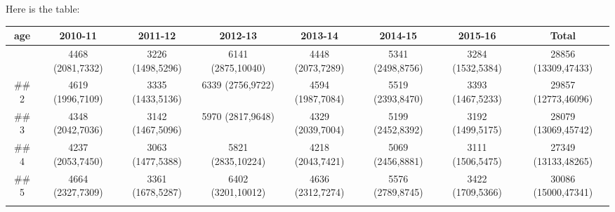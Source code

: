 \documentclass{article}\usepackage[]{graphicx}\usepackage[]{color}
\makeatletter
\newenvironment{kframe}{%
 \def\at@end@of@kframe{}%
 \ifinner\ifhmode%
  \def\at@end@of@kframe{\end{minipage}}%
  \begin{minipage}{\columnwidth}%
 \fi\fi%
 \def\FrameCommand##1{\hskip\@totalleftmargin \hskip-\fboxsep
 \colorbox{shadecolor}{##1}\hskip-\fboxsep
     \hskip-\linewidth \hskip-\@totalleftmargin \hskip\columnwidth}%
 \MakeFramed {\advance\hsize-\width
   \@totalleftmargin\z@ \linewidth\hsize
   \@setminipage}}%
 {\par\unskip\endMakeFramed%
 \at@end@of@kframe}
\newenvironment{knitrout}{}{} %
\makeatother
\begin{document}


Here is the table:
\begin{table}[ht]
\begin{tabular}{cccccccc}
age & 2010-11 & 2011-12 & 2012-13 & 2013-14 & 2014-15 & 2015-16 & Total\\
\hline
\begin{knitrout}
\definecolor{shadecolor}{rgb}{0.969, 0.969, 0.969}\color{fgcolor}\begin{kframe}
\begin{verbatim}
## 1 & 4468 (2081,7332) & 3226 (1498,5296) & 6141 (2875,10040) & 4448 (2073,7289) & 5341 (2498,8756) & 3284 (1532,5384) & 28856 (13309,47433) \\
## 2 & 4619 (1996,7109) & 3335 (1433,5136) & 6339 (2756,9722) & 4594 (1987,7084) & 5519 (2393,8470) & 3393 (1467,5233) & 29857 (12773,46096) \\
## 3 & 4348 (2042,7036) & 3142 (1467,5096) & 5970 (2817,9648) & 4329 (2039,7004) & 5199 (2452,8392) & 3192 (1499,5175) & 28079 (13069,45742) \\
## 4 & 4237 (2053,7450) & 3063 (1477,5388) & 5821 (2835,10224) & 4218 (2043,7421) & 5069 (2456,8881) & 3111 (1506,5475) & 27349 (13133,48265) \\
## 5 & 4664 (2327,7309) & 3361 (1678,5287) & 6402 (3201,10012) & 4636 (2312,7274) & 5576 (2789,8745) & 3422 (1709,5366) & 30086 (15000,47341) \\
\end{verbatim}
\end{kframe}
\end{knitrout}
\hline
\end{tabular}
\end{table}
\end{document}
